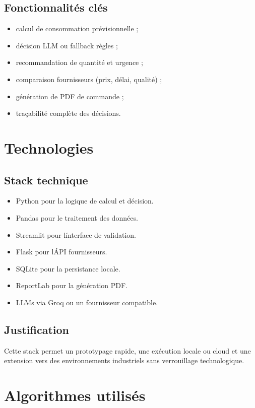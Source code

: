 \documentclass[12pt,a4paper]{report}
\begin{document}
\section{Fonctionnalit\'es cl\'es}
\begin{itemize}
  \item calcul de consommation pr\'evisionnelle ;
  \item d\'ecision LLM ou fallback r\`egles ;
  \item recommandation de quantit\'e et urgence ;
  \item comparaison fournisseurs (prix, d\'elai, qualit\'e) ;
  \item g\'en\'eration de PDF de commande ;
  \item tra\c{c}abilit\'e compl\`ete des d\'ecisions.
\end{itemize}

\cleardoublepage

\chapter{Technologies}
\section{Stack technique}
\begin{itemize}
  \item Python pour la logique de calcul et d\'ecision.
  \item Pandas pour le traitement des donn\'ees.
  \item Streamlit pour l\'interface de validation.
  \item Flask pour l\'API fournisseurs.
  \item SQLite pour la persistance locale.
  \item ReportLab pour la g\'en\'eration PDF.
  \item LLMs via Groq ou un fournisseur compatible.
\end{itemize}

\section{Justification}
Cette stack permet un prototypage rapide, une ex\'ecution locale ou cloud et une extension vers des environnements industriels sans verrouillage technologique.

\cleardoublepage

\chapter{Algorithmes utilis\'es}
\end{document}
